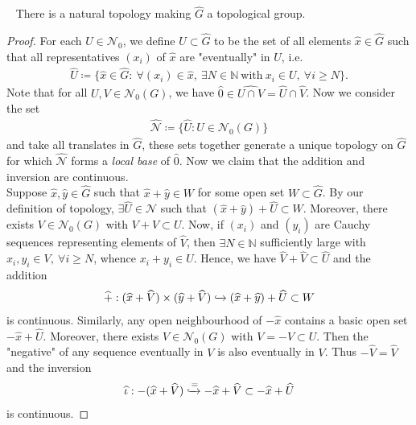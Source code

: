 \documentclass[12pt,a4paper,footinclude=true,headinclude=true]{scrbook} %
\newenvironment{proposition}[2][]
{\renewcommand\theinnercustomprop{#2}\innercustomprop[#1] 
\begin{mdframed}[backgroundcolor=gray!20]\ }
{\end{mdframed}\endinnercustomprop}
\begin{document}
\begin{proposition}{10}
    There is a natural topology making $\widehat{G}$ a topological group.
\end{proposition}
\begin{proof}
    For each $U\in\mathcal{N}_0$, we define $\widehat{U}\subset\widehat{G}$ to be the set of all elements $\widehat{x}\in\widehat{G}$ such that all representatives $(x_i)$ of $\widehat{x}$ are "eventually" in $U$, i.e.
    \begin{align*}
        \widehat{U}\coloneqq\{\widehat{x}\in\widehat{G}:\ \forall(x_i)\in\widehat{x},\ \exists N\in\mathbb{N}\ \text{with}\ x_i\in U,\ \forall i\geq N\}.
    \end{align*}
    Note that for all $U,V\in\mathcal{N}_0(G)$, we have $\widehat{0}\in\widehat{U\cap V}=\widehat{U}\cap\widehat{V}$. Now we consider the set
    \begin{align*}
        \widehat{\mathcal{N}}\coloneqq\{\widehat{U}:U\in\mathcal{N}_0(G)\}
    \end{align*}
    and take all translates in $\widehat{G}$, these sets together generate a unique topology on $\widehat{G}$ for which $\widehat{\mathcal{N}}$ forms a \textit{local base} of $\widehat{0}$. Now we claim that the addition and inversion are continuous.\\ Suppose $\widehat{x},\widehat{y}\in\widehat{G}$ such that $\widehat{x}+\widehat{y}\in W$ for some open set $W\subset\widehat{G}$. By our definition of topology, $\exists\widehat{U}\in\widehat{\mathcal{N}}$ such that $(\widehat{x}+\widehat{y})+\widehat{U}\subset W$. Moreover, there exists $V\in\mathcal{N}_0(G)$ with $V+V\subset U$. Now, if $(x_i)$ and $(y_i)$ are Cauchy sequences representing elements of $\widehat{V}$, then $\exists N\in\mathbb{N}$ sufficiently large with $x_i,y_i\in V,\ \forall i\geq N$, whence $x_i+y_i\in U$. Hence, we have $\widehat{V}+\widehat{V}\subset\widehat{U}$ and the addition
    \begin{align*}
        \widehat{+}:(\widehat{x}+\widehat{V})\times(\widehat{y}+\widehat{V})\xhookrightarrow{} (\widehat{x}+\widehat{y})+\widehat{U}\subset W
    \end{align*}
    is continuous. Similarly, any open neighbourhood of $-\widehat{x}$ contains a basic open set $-\widehat{x}+\widehat{U}$. Moreover, there exists $V\in\mathcal{N}_0(G)$ with $V=-V\subset U$. Then the "negative" of any sequence eventually in $V$ is also eventually in $V$. Thus $-\widehat{V}=\widehat{V}$ and the inversion
    \begin{align*}
        \widehat{\iota}:-(\widehat{x}+\widehat{V})\xhookrightarrow{=}-\widehat{x}+\widehat{V}\subset-\widehat{x}+\widehat{U}
    \end{align*}
    is continuous.
\end{proof}
\end{document}
